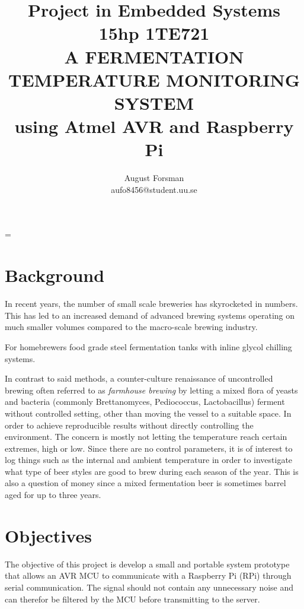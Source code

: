 \documentclass[10pt]{article}
\title{\renewcommand{\baselinestretch}{1.17}\normalsize\bf%
  Project in Embedded Systems 15hp 1TE721\\
  \vspace{2mm}
  \uppercase{A fermentation temperature monitoring system}\\
  using Atmel AVR and Raspberry Pi\\
}
\author{%
  August Forsman\\
  \small aufo8456@student.uu.se
}
\begin{document}
\date{}

\maketitle

\vspace{-0.5cm}



\baselineskip=\normalbaselineskip

\section*{Background}%
\label{sec:background}
In recent years, the number of small scale breweries has skyrocketed in numbers. This has led to an increased demand of advanced brewing systems operating on much smaller volumes compared to the macro-scale brewing industry.

For homebrewers  food grade steel fermentation tanks with inline glycol chilling systems. 

In contrast to said methods, a counter-culture renaissance of uncontrolled brewing often referred to as 
\textit{farmhouse brewing} by letting a mixed flora of yeasts and bacteria (commonly Brettanomyces, Pediococcus, Lactobacillus) ferment without controlled setting, other than moving the vessel to a suitable space. In order to achieve reproducible results without directly controlling the environment. The concern is mostly not letting the temperature reach certain extremes, high or low. Since there are no control parameters, it is of interest to log things such as the internal and ambient temperature in order to investigate what type of beer styles are good to brew during each season of the year. This is also a question of money since a mixed fermentation beer is sometimes barrel aged for up to three years.

\section*{Objectives}%
\label{sec:objectives}
The objective of this project is develop a small and portable system prototype that allows an AVR MCU to communicate with a Raspberry Pi (RPi) through serial communication. The signal should not contain any unnecessary noise and can therefor be filtered by the MCU before transmitting to the server.
\end{document}
